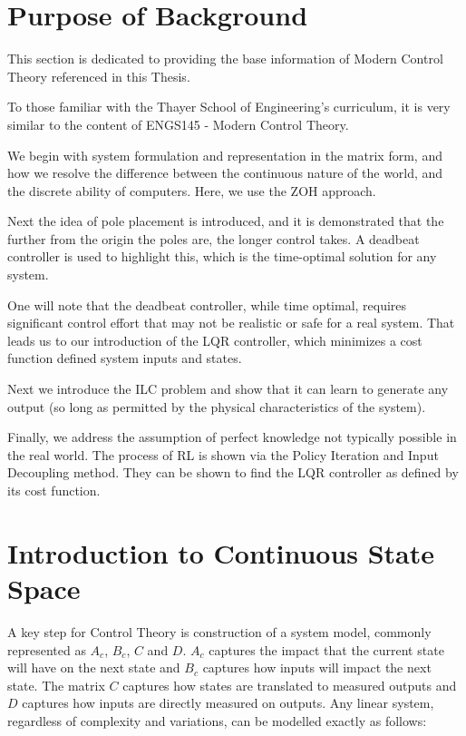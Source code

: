 

\FloatBarrier\section{Purpose of Background} %
This section is dedicated to providing the base information of Modern Control Theory referenced in this Thesis.

To those familiar with the Thayer School of Engineering's curriculum, it is very similar to the content of ENGS145 - Modern Control Theory.

We begin with system formulation and representation in the matrix form, and how we resolve the difference between the continuous nature of the world, and the discrete ability of computers. Here, we use the \ac{ZOH} approach. 

Next the idea of pole placement is introduced, and it is demonstrated that the further from the origin the poles are, the longer control takes. A deadbeat controller is used to highlight this, which is the time-optimal solution for any system.

One will note that the deadbeat controller, while time optimal, requires significant control effort that may not be realistic or safe for a real system. That leads us to our introduction of the \ac{LQR} controller, which minimizes a cost function defined system inputs and states. 

Next we introduce the \ac{ILC} problem and show that it can learn to generate any output (so long as permitted by the physical characteristics of the system). 

Finally, we address the assumption of perfect knowledge not typically possible in the real world. The process of \ac{RL} is shown via the Policy Iteration and Input Decoupling method. They can be shown to find the \ac{LQR} controller as defined by its cost function. 

\FloatBarrier\section{Introduction to Continuous State Space} %
A key step for Control Theory is construction of a system model, commonly represented as $A_c$, $B_c$, $C$ and $D$. $A_c$ captures the impact that the current state will have on the next state and $B_c$ captures how inputs will impact the next state. The matrix $C$ captures how states are translated to measured outputs and $D$ captures how inputs are directly measured on outputs. Any linear system, regardless of complexity and variations, can be modelled exactly as follows:

